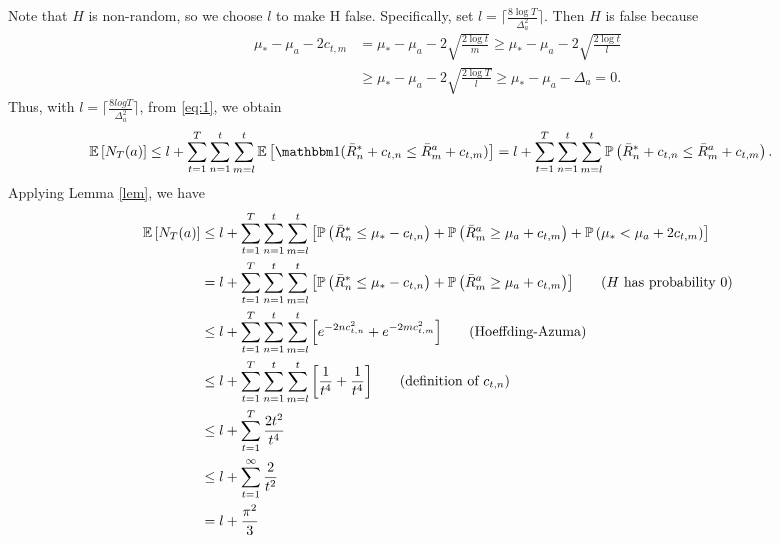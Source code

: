 \documentclass[11pt]{article}
\begin{document}
Note that $H$ is non-random, so we choose $l$ to make H false. Specifically, set $l = \Big \lceil \frac{8 \log T}{\Delta_a^2} \Big \rceil $.  Then $H$ is false because
\begin{align*}
\mu_* - \mu_a - 2c_{t,m} &= \mu_* - \mu_a - 2 \sqrt{\frac{2\log t}{m}}
                           \geq  \mu_* - \mu_a - 2 \sqrt{\frac{2\log
                           t}{l}}\\
  &\geq  \mu_* - \mu_a - 2 \sqrt{\frac{2\log T}{l}}  \geq \mu_* -
    \mu_a - \Delta_a = 0.
\end{align*}
Thus, with $l = \Big \lceil \frac{8logT}{\Delta_a^2} \Big \rceil$, from \eqref{eq:1}, we obtain
\begin{align*}
  \E{N_T(a) }  &\leq l +  \sum\limits^T_{t = 1}  \sum\limits^{t}_{n =
                 1}  \sum\limits^{t}_{m = l} \E{\ind (\bar R^*_{n} +
                 c_{t,n} \leq \bar R^a_{m} + c_{t,m}  )}= l +
                 \sum\limits^T_{t = 1}  \sum\limits^{t}_{n = 1}
                 \sum\limits^{t}_{m = l} \prob{\bar R^*_{n} +
                 c_{t,n}\leq \bar R^a_{m} + c_{t,m}  }.
\end{align*}
Applying Lemma \ref{lem}, we have
\begin{align*}
\mathbb{E}\left[ N_T(a) \right]&\leq  l +  \sum\limits^T_{t = 1}  \sum\limits^{t}_{n = 1}
  \sum\limits^{t}_{m = l} \left[ \mathbb{P}\left( \bar R^*_{n} \leq \mu_* - c_{t,n}  \right) + \mathbb{P}\left( \bar R^a_{m} \geq \mu_a + c_{t,m} \right)  + \mathbb{P}\left(  \mu_* < \mu_a + 2c_{t,m}   \right)\right] \\
&=  l +  \sum\limits^T_{t = 1}  \sum\limits^{t}_{n = 1} \sum\limits^{t}_{m = l} \left[ \mathbb{P}\left( \bar R^*_{n} \leq \mu_* -
                                                     c_{t,n}  \right) +
                                                     \mathbb{P}\left( \bar
                                                     R^a_{m} \geq
                                                     \mu_a + c_{t,m}  \right)
                                                     \right] \hspace{18pt}(H \text{
  has probability 0})\\
 &\leq  l +  \sum\limits^T_{t = 1}  \sum\limits^{t}_{n = 1}  \sum\limits^{t}_{m = l} \left[ e^{-2nc^2_{t,n}} + e^{-2mc^2_{t,m}}   \right]  \hspace{18pt}\text{(Hoeffding-Azuma)}\\
 &\leq  l +  \sum\limits^T_{t = 1}  \sum\limits^{t}_{n = 1}  \sum\limits^{t}_{m = l} \left[ \frac{1}{t^4} + \frac{1}{t^4}   \right]   \hspace{18pt}(\text{definition of }c_{t,n})\\
 &\leq l + \sum\limits^T_{t = 1} \frac{2t^2}{t^4}\\
 &\leq l + \sum\limits^\infty_{t = 1} \frac{2}{t^2}\\
 &= l + \frac{\pi^2}{3} 
\end{align*}
\end{document}
